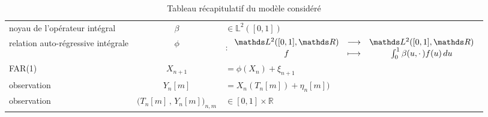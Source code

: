 \begin{table}[H]
\begin{tabularx}{\textwidth}{XcX}
		\midrule
		noyau de l'opérateur intégral                & $\beta$                                     & $\in \mathds L^2([0,1])$                                                                                           \\
		relation auto-régressive intégrale           & $\phi$                                      & $: \func{\mathds L^2([0,1], \mathds R)}{\mathds L^2([0,1], \mathds R)}{f}{\int_0^1 \beta(u, \cdot \, )f(u) \, du}$ \\
		FAR(1)                                       & $X_{n+1}$                                   & $= \phi( X_n )+ \xi_{n+1}$                                                                                         \\
		\midrule
		observation                                  & $Y_n[m]$                                    & $= X_n( T_n[m] ) + \eta_{n}[m] )$                                                                                \\
		observation                                  & $\bigl( T_n[m] \, , \, Y_n[m] \bigr)_{n,m}$ & $\in [0,1] \times \mathds R$                                                                                       \\
		\bottomrule
	\end{tabularx}
	\caption{Tableau récapitulatif du modèle considéré}
	\label{tab:model}
\end{table}
